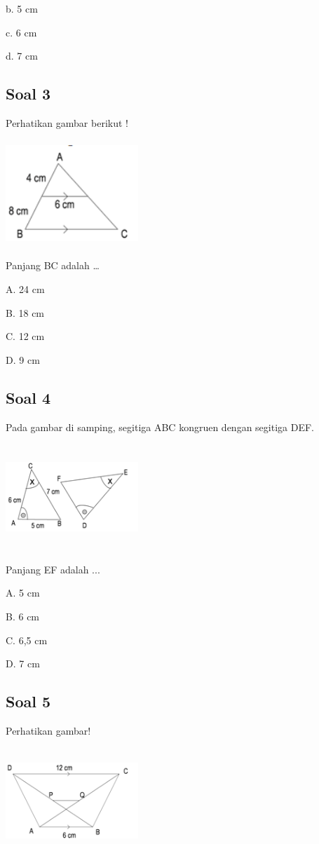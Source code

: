 \documentclass[11pt,fleqn]{book} %
\begin{document}
b. 5 cm 

c. 6 cm 

d. 7 cm 

\subsection{Soal 3}

Perhatikan gambar berikut ! 

\includegraphics[width = 5cm, height= 4cm]{Pictures/a40.png}

Panjang BC adalah … 

A. 24 cm 

B. 18 cm 

C. 12 cm 

D. 9 cm 

\subsection{Soal 4}
Pada gambar di samping, segitiga ABC kongruen dengan segitiga DEF. 

\includegraphics[width = 5cm, height= 4cm]{Pictures/a41.png}

Panjang EF adalah ... 

A. 5 cm 

B. 6 cm 

C. 6,5 cm 

D. 7 cm 

\subsection{Soal 5}

Perhatikan gambar! 

\includegraphics[width = 5cm, height= 4cm]{Pictures/a42.png}
\end{document}

